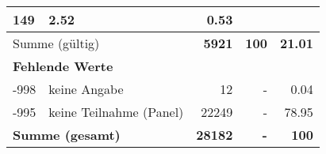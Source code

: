 \begin{longtable}{lXrrr}
       \num{149} &
       \num[round-mode=places,round-precision=2]{2.52} &
         \num[round-mode=places,round-precision=2]{0.53} \\
     \midrule
     \multicolumn{2}{l}{Summe (gültig)} &
       \textbf{\num{5921}} &
     \textbf{100} &
       \textbf{\num[round-mode=places,round-precision=2]{21.01}} \\
     \multicolumn{5}{l}{\textbf{Fehlende Werte}}\\
       -998 &
       keine Angabe &
         \num{12} &
        - &
         \num[round-mode=places,round-precision=2]{0.04} \\
       -995 &
       keine Teilnahme (Panel) &
         \num{22249} &
        - &
         \num[round-mode=places,round-precision=2]{78.95} \\
     \midrule
     \multicolumn{2}{l}{\textbf{Summe (gesamt)}} &
          \textbf{\num{28182}} &
        \textbf{-} &
        \textbf{100} \\
     \bottomrule
     \end{longtable}
     
